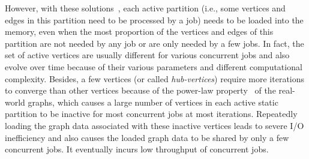 \documentclass[10pt,journal,compsoc]{IEEEtran}
\begin{document}

However, with these solutions~\cite{seraph,seraph1,CGraph,CGraph2019,GraphM}, each active partition (i.e., some vertices and edges in this partition need to be processed by a job) needs to be loaded into the memory, even when the most proportion of the vertices and edges of this partition are not needed by any job or are only needed by a few jobs.
In fact, the set of active vertices are usually different for various concurrent jobs and also evolve over time because of their various parameters and different computational complexity. Besides, a few vertices (or called {\em hub-vertices}) require more iterations to converge than other vertices because of the power-law property~\cite{PowerGraph} of the real-world graphs, which causes a large number of vertices in each active static partition to be inactive for most concurrent jobs at most iterations.
Repeatedly loading the graph data associated with these inactive vertices leads to severe I/O inefficiency and also causes the loaded graph data to be shared by only a few concurrent jobs. It eventually incurs low throughput of concurrent jobs.
\end{document}
